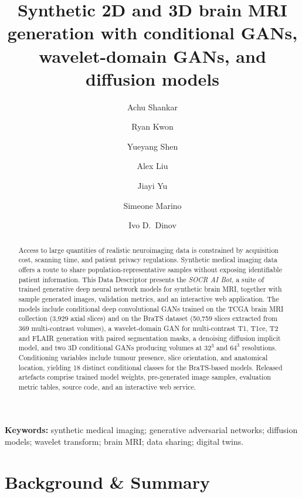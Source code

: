 \documentclass[11pt]{article}
\title{Synthetic 2D and 3D brain MRI generation with conditional GANs, wavelet-domain GANs, and diffusion models}
\author[1]{Achu Shankar}
\author[1]{Ryan Kwon}
\author[1]{Yueyang Shen}
\author[1]{Alex Liu}
\author[1]{Jiayi Yu}
\author[1]{Simeone Marino}
\author[1,*]{Ivo D.\ Dinov}
\affil[1]{Statistics Online Computational Resource (SOCR), University of Michigan, Ann Arbor, MI 48109, USA}
\affil[*]{Corresponding author: \texttt{statistics@umich.edu}}
\date{}
\begin{document}
\maketitle

\begin{abstract}
\noindent
Access to large quantities of realistic neuroimaging data is constrained by acquisition cost, scanning time, and patient privacy regulations. Synthetic medical imaging data offers a route to share population-representative samples without exposing identifiable patient information. This Data Descriptor presents the \emph{SOCR AI Bot}, a suite of trained generative deep neural network models for synthetic brain MRI, together with sample generated images, validation metrics, and an interactive web application. The models include conditional deep convolutional GANs trained on the TCGA brain MRI collection (3{,}929 axial slices) and on the BraTS dataset (50{,}759 slices extracted from 369 multi-contrast volumes), a wavelet-domain GAN for multi-contrast T1, T1ce, T2 and FLAIR generation with paired segmentation masks, a denoising diffusion implicit model, and two 3D conditional GANs producing volumes at $32^{3}$ and $64^{3}$ resolutions. Conditioning variables include tumour presence, slice orientation, and anatomical location, yielding 18 distinct conditional classes for the BraTS-based models. Released artefacts comprise trained model weights, pre-generated image samples, evaluation metric tables, source code, and an interactive web service.
\end{abstract}

\vspace{0.5em}
\noindent\textbf{Keywords:} synthetic medical imaging; generative adversarial networks; diffusion models; wavelet transform; brain MRI; data sharing; digital twins.

\newpage

\section*{Background \& Summary}
\label{sec:background}
\end{document}

